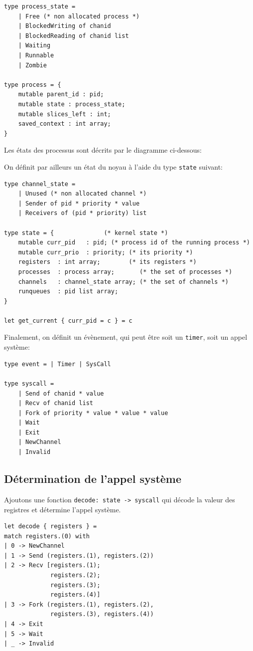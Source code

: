 \documentclass[french, toc]{../cs-classes/cs-classes}
\begin{document}
\begin{verbatim}
type process_state =
    | Free (* non allocated process *)
    | BlockedWriting of chanid
    | BlockedReading of chanid list
    | Waiting
    | Runnable
    | Zombie

type process = {
    mutable parent_id : pid;
    mutable state : process_state;
    mutable slices_left : int;
    saved_context : int array;
}
\end{verbatim}

\noindent Les états des processus sont décrits par le diagramme ci-dessous:


\noindent On définit par ailleurs un état du noyau à l'aide du type \texttt{state} suivant:
\begin{verbatim}
type channel_state =
    | Unused (* non allocated channel *)
    | Sender of pid * priority * value
    | Receivers of (pid * priority) list

type state = {              (* kernel state *)
    mutable curr_pid   : pid; (* process id of the running process *)
    mutable curr_prio  : priority; (* its priority *)
    registers  : int array;        (* its registers *)
    processes  : process array;       (* the set of processes *)
    channels   : channel_state array; (* the set of channels *)
    runqueues  : pid list array;
}

let get_current { curr_pid = c } = c
\end{verbatim}

\noindent Finalement, on définit un évènement, qui peut être soit un \texttt{timer}, soit un appel système:
\begin{verbatim}
type event = | Timer | SysCall

type syscall =
    | Send of chanid * value
    | Recv of chanid list
    | Fork of priority * value * value * value
    | Wait
    | Exit
    | NewChannel
    | Invalid
\end{verbatim}

\subsection{Détermination de l'appel système}
Ajoutons une fonction \texttt{decode: state -> syscall} qui décode la valeur des registres et détermine l'appel système.
\begin{verbatim}
let decode { registers } =
match registers.(0) with
| 0 -> NewChannel
| 1 -> Send (registers.(1), registers.(2))
| 2 -> Recv [registers.(1);
             registers.(2);
             registers.(3);
             registers.(4)]
| 3 -> Fork (registers.(1), registers.(2),
             registers.(3), registers.(4))
| 4 -> Exit
| 5 -> Wait
| _ -> Invalid
\end{verbatim}
\end{document}
